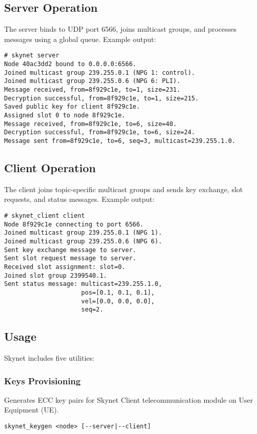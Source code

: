 \documentclass{article}
\begin{document}
\subsection{Server Operation}
The server binds to UDP port 6566, joins multicast groups, and processes messages using a global
queue. Example output:
\begin{lstlisting}
# skynet server
Node 40ac3dd2 bound to 0.0.0.0:6566.
Joined multicast group 239.255.0.1 (NPG 1: control).
Joined multicast group 239.255.0.6 (NPG 6: PLI).
Message received, from=8f929c1e, to=1, size=231.
Decryption successful, from=8f929c1e, to=1, size=215.
Saved public key for client 8f929c1e.
Assigned slot 0 to node 8f929c1e.
Message received, from=8f929c1e, to=6, size=40.
Decryption successful, from=8f929c1e, to=6, size=24.
Message sent from=8f929c1e, to=6, seq=3, multicast=239.255.1.0.
\end{lstlisting}

\subsection{Client Operation}
The client joins topic-specific multicast groups and sends key exchange, slot requests, and status
messages. Example output:
\begin{lstlisting}
# skynet_client client
Node 8f929c1e connecting to port 6566.
Joined multicast group 239.255.0.1 (NPG 1).
Joined multicast group 239.255.0.6 (NPG 6).
Sent key exchange message to server.
Sent slot request message to server.
Received slot assignment: slot=0.
Joined slot group 2399540.1.
Sent status message: multicast=239.255.1.0,
                     pos=[0.1, 0.1, 0.1],
                     vel=[0.0, 0.0, 0.0],
                     seq=2.
\end{lstlisting}

\newpage
\subsection{Usage}
Skynet includes five utilities:

\subsubsection*{Keys Provisioning}
Generates ECC key pairs for Skynet Client telecommunication module on User Equipment (UE).
\begin{lstlisting}
skynet_keygen <node> [--server|--client]
\end{lstlisting}
\end{document}

